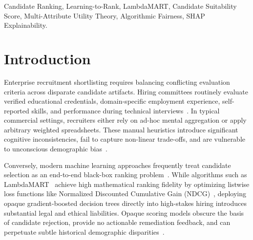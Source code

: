 \documentclass[conference]{IEEEtran}
\begin{document}
\begin{IEEEkeywords}
Candidate Ranking, Learning-to-Rank, LambdaMART, Candidate Suitability Score, Multi-Attribute Utility Theory, Algorithmic Fairness, SHAP Explainability.
\end{IEEEkeywords}

\section{Introduction}
Enterprise recruitment shortlisting requires balancing conflicting evaluation criteria across disparate candidate artifacts. Hiring committees routinely evaluate verified educational credentials, domain-specific employment experience, self-reported skills, and performance during technical interviews~\cite{sackett2022revisiting}. In typical commercial settings, recruiters either rely on ad-hoc mental aggregation or apply arbitrary weighted spreadsheets. These manual heuristics introduce significant cognitive inconsistencies, fail to capture non-linear trade-offs, and are vulnerable to unconscious demographic bias~\cite{singh2018fairness}.

Conversely, modern machine learning approaches frequently treat candidate selection as an end-to-end black-box ranking problem~\cite{zhang2023job}. While algorithms such as LambdaMART~\cite{burges2010ranknet} achieve high mathematical ranking fidelity by optimizing listwise loss functions like Normalized Discounted Cumulative Gain (NDCG)~\cite{jarvelin2002cumulated}, deploying opaque gradient-boosted decision trees directly into high-stakes hiring introduces substantial legal and ethical liabilities. Opaque scoring models obscure the basis of candidate rejection, provide no actionable remediation feedback, and can perpetuate subtle historical demographic disparities~\cite{hardt2016equality, zehlike2017fair}.
\end{document}
